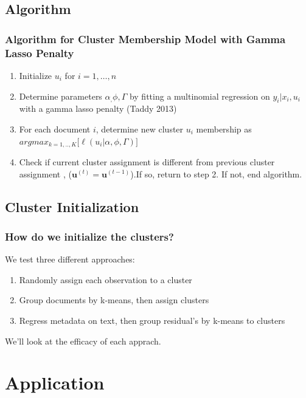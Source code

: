 \documentclass{beamer}
\begin{document}
\subsection{Algorithm}
\begin{frame}
\frametitle{Algorithm for Cluster Membership Model with Gamma Lasso Penalty}
\begin{enumerate}
\def\labelenumi{\arabic{enumi}.}
\item
 Initialize $u_i$ for $i = 1, \dots, n$
\item
  Determine parameters $\alpha_, \phi, \Gamma$ by fitting a multinomial
  regression on $y_i | x_i , u_i$ with a gamma lasso penalty (Taddy 2013)
\item
  For each document $i$, determine new cluster $u_i$ membership as \\
  $argmax_{k = 1,..,K} \big[  \ell(u_i| \alpha, \phi, \Gamma) \big]$
\item 
Check if current cluster assignment is different from previous cluster assignment , ($\textbf{u}^{(t)}  = \textbf{u}^{(t-1)}$).If so, return to step 2. If not, end algorithm.
\end{enumerate}
\end{frame}

\subsection{Cluster Initialization}
\begin{frame}
\frametitle{How do we initialize the clusters?}
We test three different approaches:
\begin{enumerate}
\item Randomly assign each observation to a cluster 
\item Group documents by k-means, then assign clusters 
\item Regress metadata on text, then group residual's by k-means to clusters
\end{enumerate}
We'll look at the efficacy of each apprach.
\end{frame}


\section{Application}
\end{document}
